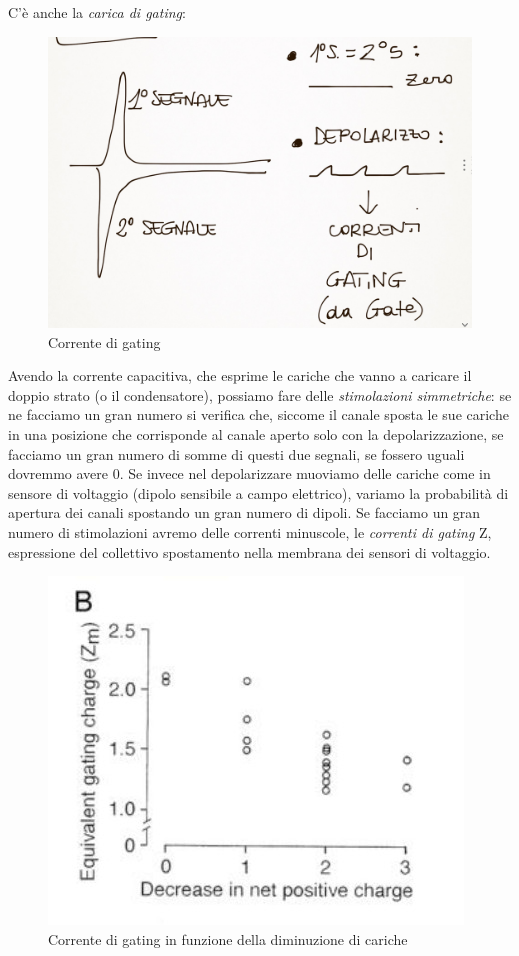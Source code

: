 \documentclass[a4paper,12pt]{article}
\begin{document}
C'è anche la \emph{carica di gating}:
\begin{figure}[H]
\centering
\includegraphics[scale=0.1]{immagine/18.jpg}
\caption{Corrente di gating}
\end{figure} 

Avendo la corrente capacitiva, che esprime le cariche che vanno a caricare il doppio strato (o il condensatore), possiamo fare delle \emph{stimolazioni simmetriche}: se ne facciamo un gran numero si verifica che, siccome il canale sposta le sue cariche in una posizione che corrisponde al canale aperto solo con la depolarizzazione, se facciamo un gran numero di somme di questi due segnali, se fossero uguali dovremmo avere 0. Se invece nel depolarizzare muoviamo delle cariche come in sensore di voltaggio (dipolo sensibile a campo elettrico), variamo la probabilità di apertura dei canali spostando un gran numero di dipoli. Se facciamo un gran numero di stimolazioni avremo delle correnti minuscole, le \emph{correnti di gating} Z, espressione del collettivo spostamento nella membrana dei sensori di voltaggio.

\begin{figure}[H]
\centering
\includegraphics[scale=0.4]{immagine/Z.jpg}
\caption{Corrente di gating in funzione della diminuzione di cariche}
\end{figure} 
\end{document}

